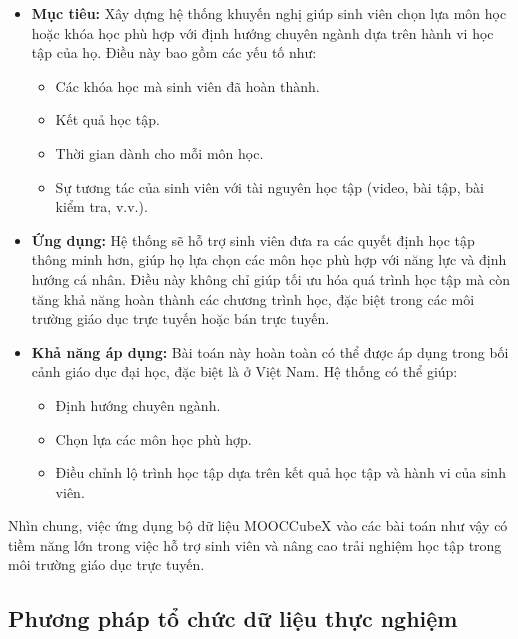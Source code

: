 \begin{itemize}
    \item \textbf{Mục tiêu:} Xây dựng hệ thống khuyến nghị giúp sinh viên chọn lựa môn học hoặc khóa học phù hợp với định hướng chuyên ngành dựa trên hành vi học tập của họ. Điều này bao gồm các yếu tố như:
    \begin{itemize}
        \item Các khóa học mà sinh viên đã hoàn thành.
        \item Kết quả học tập.
        \item Thời gian dành cho mỗi môn học.
        \item Sự tương tác của sinh viên với tài nguyên học tập (video, bài tập, bài kiểm tra, v.v.).
    \end{itemize}

    \item \textbf{Ứng dụng:} Hệ thống sẽ hỗ trợ sinh viên đưa ra các quyết định học tập thông minh hơn, giúp họ lựa chọn các môn học phù hợp với năng lực và định hướng cá nhân. Điều này không chỉ giúp tối ưu hóa quá trình học tập mà còn tăng khả năng hoàn thành các chương trình học, đặc biệt trong các môi trường giáo dục trực tuyến hoặc bán trực tuyến.

    \item \textbf{Khả năng áp dụng:} Bài toán này hoàn toàn có thể được áp dụng trong bối cảnh giáo dục đại học, đặc biệt là ở Việt Nam. Hệ thống có thể giúp:
    \begin{itemize}
        \item Định hướng chuyên ngành.
        \item Chọn lựa các môn học phù hợp.
        \item Điều chỉnh lộ trình học tập dựa trên kết quả học tập và hành vi của sinh viên.
    \end{itemize}
\end{itemize}

Nhìn chung, việc ứng dụng bộ dữ liệu MOOCCubeX vào các bài toán như vậy có tiềm năng lớn trong việc hỗ trợ sinh viên và nâng cao trải nghiệm học tập trong môi trường giáo dục trực tuyến.






\subsection{Phương pháp tổ chức dữ liệu thực nghiệm}
\label{sec:chuanbidulieu}
\newpage
